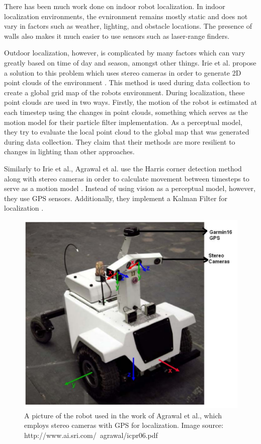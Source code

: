 \documentclass[letterpaper, 12 pt, conference]{ieeeconf}  %
\begin{document}
There has been much work done on indoor robot localization. In indoor localization environments, the evnironment remains mostly static and does not vary in factors such as weather, lighting, and obstacle locations. The presence of walls also makes it much easier to use sensors such as laser-range finders. 
\par
Outdoor localization, however, is complicated by many factors which can vary greatly based on time of day and season, amongst other things. Irie et al. propose a solution to this problem which uses stereo cameras in order to generate 2D point clouds of the environment \cite{irie2010mobile}. This method is used during data collection to create a global grid map of the robots environment. During localization, these point clouds are used in two ways. Firstly, the motion of the robot is estimated at each timestep using the changes in point clouds, something which serves as the motion model for their particle filter implementation. As a perceptual model, they try to evaluate the local point cloud  to the global map that was generated during data collection. They claim that their methods are more resilient to changes in lighting than other approaches.
\par
Similarly to Irie et al., Agrawal et al. use the Harris corner detection method \cite{Harris} along with stereo cameras in order to calculate movement between timesteps to serve as a motion model \cite{agrawal2006real}. Instead of using vision as a perceptual model, however, they use GPS sensors. Additionally, they implement a Kalman Filter for localization \cite{Kalman}.

\begin{figure}[h]
\centering
\includegraphics[scale=0.75]{Stereo}
\caption{A picture of the robot used in the work of Agrawal et al., which employs stereo cameras with GPS for localization. Image source: http://www.ai.sri.com/~agrawal/icpr06.pdf}
\end{figure}
\end{document}
